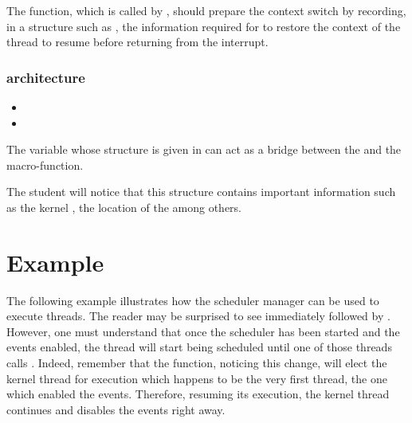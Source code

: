 The  function, which is called by
, should prepare the context switch by
recording, in a structure such as , the information
required for  to restore the context
of the thread to resume before returning from the interrupt.

\subsubsection*{architecture}

\begin{itemize}
  \item
  \item
\end{itemize}

The  variable whose structure is given in
 can act as a bridge between the
 and the
 macro-function.

The student will notice that this structure contains important information
such as the kernel , the location
of the  among others.

%
%

\section{Example}

The following example illustrates how the scheduler manager can be used
to execute threads. The reader may be surprised to see 
immediately followed by . However, one must understand
that once the scheduler has been started and the events enabled, the
thread will start being scheduled until one of those threads calls
. Indeed, remember that the 
function, noticing this change, will elect the kernel thread for execution
which happens to be the very first thread, the one which enabled the events.
Therefore, resuming its execution, the kernel thread continues and
disables the events right away.


